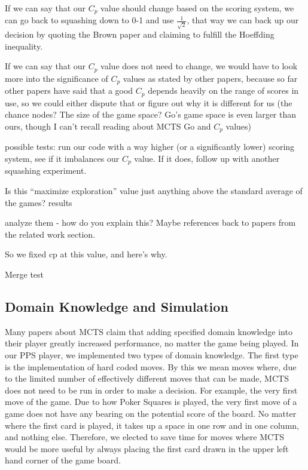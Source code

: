 \documentclass[letterpaper]{article}
\begin{document}
If we can say that our $C_p$ value should change based on the scoring system, we can go back to squashing down to 0-1 and use $\frac{1}{\sqrt{2}}$, that way we can back up our decision by quoting the Brown paper and claiming to fulfill the Hoeffding inequality.

If we can say that our $C_p$ value does not need to change, we would have to look more into the significance of $C_p$ values as stated by other papers, because so far other papers have said that a good $C_p$ depends heavily on the range of scores in use, so we could either dispute that or figure out why it is different for us (the chance nodes? The size of the game space? Go’s game space is even larger than ours, though I can’t recall reading about MCTS Go and $C_p$ values)

possible tests: run our code with a way higher (or a significantly lower) scoring system, see if it imbalances our $C_p$ value. If it does, follow up with another squashing experiment.

Is this “maximize exploration” value just anything above the standard average of the games? 
results

analyze them - how do you explain this? Maybe references back to papers from the related work section.

So we fixed cp at this value, and here's why.

Merge test

\subsection{Domain Knowledge and Simulation}
Many papers about MCTS claim that adding specified domain knowledge into their player greatly increased performance, no matter the game being played. In our PPS player, we implemented two types of domain knowledge.
The first type is the implementation of hard coded moves. By this we mean moves where, due to the limited number of effectively different moves that can be made, MCTS does not need to be run in order to make a decision. For example, the very first move of the game. Due to how Poker Squares is played, the very first move of a game does not have any bearing on the potential score of the board. No matter where the first card is played, it takes up a space in one row and in one column, and nothing else. Therefore, we elected to save time for moves where MCTS would be more useful by always placing the first card drawn in the upper left hand corner of the game board.
\end{document}
